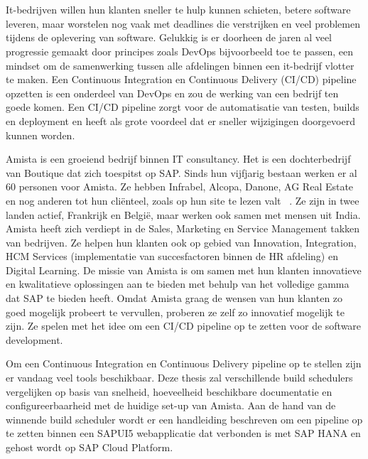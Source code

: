 
\chapter{}
\label{ch:inleiding}

It-bedrijven willen hun klanten sneller te hulp kunnen schieten, betere software leveren, maar worstelen nog vaak met deadlines die verstrijken en veel problemen tijdens de oplevering van software. Gelukkig is er doorheen de jaren al veel progressie gemaakt door principes zoals DevOps bijvoorbeeld toe te passen, een mindset om de samenwerking tussen alle afdelingen binnen een it-bedrijf vlotter te maken. 
Een Continuous Integration en Continuous Delivery (CI/CD) pipeline opzetten is een onderdeel van DevOps en zou de werking van een bedrijf ten goede komen. Een CI/CD pipeline zorgt voor de automatisatie van testen, builds en deployment en heeft als grote voordeel dat er sneller wijzigingen doorgevoerd kunnen worden.

Amista is een groeiend bedrijf binnen IT consultancy. Het is een dochterbedrijf van Boutique dat zich toespitst op SAP. Sinds hun vijfjarig bestaan werken er al 60 personen voor Amista. Ze hebben Infrabel, Alcopa, Danone, AG Real Estate en nog anderen tot hun cliënteel, zoals op hun site te lezen valt ~\autocite{Amista2018}.
Ze zijn in twee landen actief, Frankrijk en België, maar werken ook samen met mensen uit India.
Amista heeft zich verdiept in de Sales, Marketing en Service Management takken van bedrijven. Ze helpen hun klanten ook op gebied van Innovation, Integration, HCM Services (implementatie van succesfactoren binnen de HR afdeling) en Digital Learning.
De missie van Amista is om samen met hun klanten innovatieve en kwalitatieve oplossingen aan te bieden met behulp van het volledige gamma dat SAP te bieden heeft.
Omdat Amista graag de wensen van hun klanten zo goed mogelijk probeert te vervullen, proberen ze zelf zo innovatief mogelijk te zijn. Ze spelen met het idee om een CI/CD pipeline op te zetten voor de software development.

Om een Continuous Integration en Continuous Delivery pipeline op te stellen zijn er vandaag veel tools beschikbaar.
Deze thesis zal verschillende build schedulers vergelijken op basis van snelheid, hoeveelheid beschikbare documentatie en configureerbaarheid met de huidige set-up van Amista.
Aan de hand van de winnende build scheduler wordt er een handleiding beschreven om een pipeline op te zetten binnen een SAPUI5 webapplicatie dat verbonden is met SAP HANA en gehost wordt op SAP Cloud Platform.

